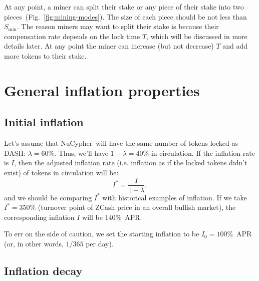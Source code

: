 \documentclass[longbibliography,nofootinbib,twocolumn]{revtex4-1}
\newcommand{\nucypher}{NuCypher}
\newcommand{\figref}[1]{Fig.~\ref{#1}}
\begin{document}
At any point, a miner can split their stake or any piece of their stake into two pieces~(\figref{fig:mining-modes}).
The size of each piece should be not less than $S_{\min}$.
The reason miners may want to split their stake is because their compensation rate depends on the lock time $T$,
which will be discussed in more details later.
At any point the miner can increase (but not decrease) $T$ and add more tokens to their stake.

\section{General inflation properties}

\subsection{Initial inflation}

Let's assume that \nucypher~will have the same number of tokens locked as DASH: $\lambda=60\%$.
Thus, we'll have $1-\lambda=40\%$ in circulation.
If the inflation rate is $I$, then the adjusted inflation rate (i.e. inflation as if the locked tokens didn't exist) of tokens in circulation will be:
\begin{equation}
    I^* = \frac{I}{1-\lambda},
\end{equation}
and we should be comparing $I^*$ with historical examples of inflation.
If we take $I^*=350\%$ (turnover point of ZCash price in an overall bullish market), the corresponding inflation $I$ will be $140\%$~APR.

To err on the side of caution, we set the starting inflation to be $I_0=100\%$~APR (or, in other words, $1/365$ per day).

\subsection{Inflation decay}
\end{document}
